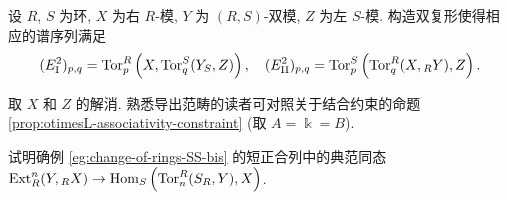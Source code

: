 \begin{Exercises}
	\item 设 $R$, $S$ 为环, $X$ 为右 $R$-模, $Y$ 为 $(R, S)$-双模, $Z$ 为左 $S$-模. 构造双复形使得相应的谱序列满足
	\[ (E_{\mathrm{I}}^2)_{p,q} = \operatorname{Tor}^R_p\left( X, \operatorname{Tor}^S_q(Y_S, Z) \right), \quad (E_{\mathrm{II}}^2)_{p,q} = \operatorname{Tor}^S_p\left( \operatorname{Tor}^R_q(X, {}_R Y), Z \right). \]
	\begin{hint}
		取 $X$ 和 $Z$ 的解消. 熟悉导出范畴的读者可对照关于结合约束的命题 \ref{prop:otimesL-associativity-constraint} (取 $A = \Bbbk = B$).
	\end{hint}

	\item 试明确例 \ref{eg:change-of-rings-SS-bis} 的短正合列中的典范同态 $\operatorname{Ext}^n_R(Y, {}_R X) \to \operatorname{Hom}_S\left( \operatorname{Tor}^R_n(S_R, Y), X \right)$.
\end{Exercises}
